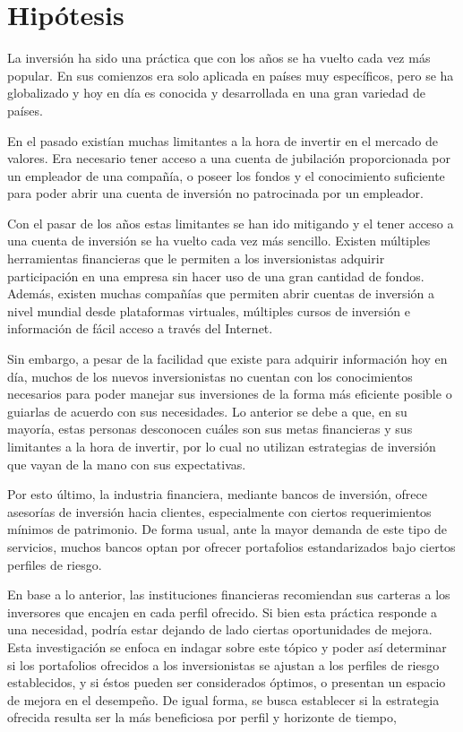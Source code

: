 \section{Hipótesis} 
La inversión ha sido una práctica que con los años se ha vuelto cada vez más popular. En
sus comienzos era solo aplicada en países muy específicos, pero se ha globalizado y hoy en día es
conocida y desarrollada en una gran variedad de países. 

En el pasado existían muchas limitantes a la hora de invertir en el mercado de valores. Era necesario
tener acceso a una cuenta de jubilación proporcionada por un empleador de una compañía, o poseer
los fondos y el conocimiento suficiente para poder abrir una cuenta de inversión no patrocinada por
un empleador.

Con el pasar de los años estas limitantes se han ido mitigando y el tener acceso a una cuenta de
inversión se ha vuelto cada vez más sencillo. Existen múltiples herramientas financieras que le
permiten a los inversionistas adquirir participación en una empresa sin hacer uso de una gran cantidad
de fondos. Además, existen muchas compañías que permiten abrir cuentas de inversión a nivel
mundial desde plataformas virtuales, múltiples cursos de inversión e información de fácil acceso a
través del Internet.

Sin embargo, a pesar de la facilidad que existe para adquirir información hoy en día, muchos de los
nuevos inversionistas no cuentan con los conocimientos necesarios para poder manejar sus
inversiones de la forma más eficiente posible o guiarlas de acuerdo con sus necesidades. Lo anterior
se debe a que, en su mayoría, estas personas desconocen cuáles son sus metas financieras y sus
limitantes a la hora de invertir, por lo cual no utilizan estrategias de inversión que vayan de la mano
con sus expectativas.

Por esto último, la industria financiera, mediante bancos de inversión, ofrece asesorías de inversión
hacia clientes, especialmente con ciertos requerimientos mínimos de patrimonio. De forma usual,
ante la mayor demanda de este tipo de servicios, muchos bancos optan por ofrecer portafolios
estandarizados bajo ciertos perfiles de riesgo.

En base a lo anterior, las instituciones financieras recomiendan sus carteras a los inversores que
encajen en cada perfil ofrecido. Si bien esta práctica responde a una necesidad, podría estar dejando
de lado ciertas oportunidades de mejora. Esta investigación se enfoca en indagar sobre este tópico y
poder así determinar si los portafolios ofrecidos a los inversionistas se ajustan a los perfiles de riesgo
establecidos, y si éstos pueden ser considerados óptimos, o presentan un espacio de mejora en el
desempeño. De igual forma, se busca establecer si la estrategia ofrecida resulta ser la más beneficiosa
por perfil y horizonte de tiempo,

